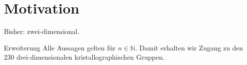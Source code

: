 \documentclass{beamer}
\theoremstyle{plain}
\newcommand\R{\mathbb R}
\newcommand\N{\mathbb N}
\begin{document}
    
    
    
    
    
    
    


\section{Motivation}
\begin{frame}
    Bisher: zwei-dimensional.
    \begin{block}{Erweiterung}
         Alle Aussagen gelten für $n \in \N$. Damit erhalten wir Zugang zu den 230 drei-dimensionalen kristallographischen Gruppen.
    \end{block}
\end{frame}
\end{document}
